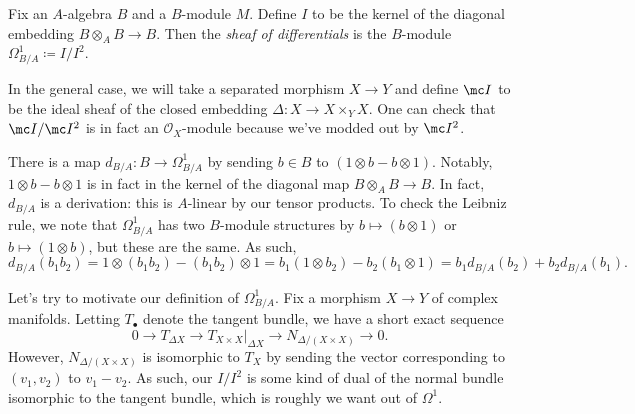 \documentclass[../notes.tex]{subfiles}
\begin{document}
\begin{definition}
	Fix an $A$-algebra $B$ and a $B$-module $M$. Define $I$ to be the kernel of the diagonal embedding $B\otimes_AB\to B$. Then the \textit{sheaf of differentials} is the $B$-module $\Omega^1_{B/A}\coloneqq I/I^2$.
\end{definition}
\begin{remark}
	In the general case, we will take a separated morphism $X\to Y$ and define $\mc I$ to be the ideal sheaf of the closed embedding $\Delta\colon X\to X\times_YX$. One can check that $\mc I/\mc I^2$ is in fact an $\mathcal O_X$-module because we've modded out by $\mc I^2$.
\end{remark}
\begin{remark}
	There is a map $d_{B/A}\colon B\to\Omega^1_{B/A}$ by sending $b\in B$ to $(1\otimes b-b\otimes1)$. Notably, $1\otimes b-b\otimes1$ is in fact in the kernel of the diagonal map $B\otimes_AB\to B$. In fact, $d_{B/A}$ is a derivation: this is $A$-linear by our tensor products. To check the Leibniz rule, we note that $\Omega^1_{B/A}$ has two $B$-module structures by $b\mapsto(b\otimes1)$ or $b\mapsto(1\otimes b)$, but these are the same. As such,
	\[d_{B/A}(b_1b_2)=1\otimes(b_1b_2)-(b_1b_2)\otimes1=b_1(1\otimes b_2)-b_2(b_1\otimes1)=b_1d_{B/A}(b_2)+b_2d_{B/A}(b_1).\]
\end{remark}
\begin{remark}
	Let's try to motivate our definition of $\Omega^1_{B/A}$. Fix a morphism $X\to Y$ of complex manifolds. Letting $T_\bullet$ denote the tangent bundle, we have a short exact sequence
	\[0\to T_{\Delta X}\to T_{X\times X}|_{\Delta X}\to N_{\Delta/(X\times X)}\to0.\]
	However, $N_{\Delta/(X\times X)}$ is isomorphic to $T_X$ by sending the vector corresponding to $(v_1,v_2)$ to $v_1-v_2$. As such, our $I/I^2$ is some kind of dual of the normal bundle isomorphic to the tangent bundle, which is roughly we want out of $\Omega^1$.
\end{remark}
\end{document}
